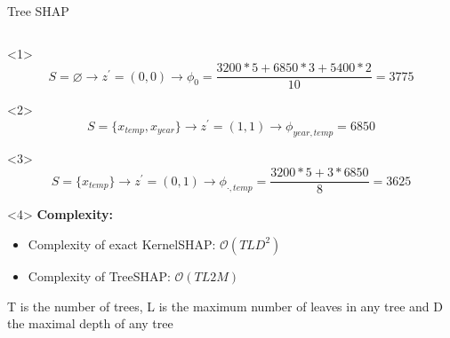 \documentclass[11pt,compress,t,notes=noshow, aspectratio=169, xcolor=table]{beamer}
\begin{document}
\begin{vbframe}{Tree SHAP}
\begin{onlyenv}
\begin{table}
\begin{columns}[T]
\begin{column}{0.7\textwidth}
\end{column}
\end{columns}
\end{table}

\begin{onlyenv}<1>
$$
S = \varnothing \rightarrow z^{\prime} = (0, 0) \rightarrow \phi_0 = \frac{3200*5 + 6850*3 +5400*2}{10}= 3775
$$
\end{onlyenv}

\begin{onlyenv}<2>
$$
S = \{x_{temp}, x_{year}\} \rightarrow z^{\prime} = (1, 1)  \rightarrow \phi_{year, temp} = 6850
$$
\end{onlyenv}

\begin{onlyenv}<3>
$$
S = \{x_{temp}\} \rightarrow z^{\prime} = (0, 1)  \rightarrow \phi_{\cdot, temp} = \frac{3200*5 + 3* 6850}{8} = 3625
$$
\end{onlyenv}
\end{onlyenv}

\begin{onlyenv}<4>
\vspace{1.5cm}
\textbf{Complexity:}
\begin{itemize}
    \item Complexity of exact KernelSHAP: $\mathcal{O}(TLD^2)$
    \item Complexity of TreeSHAP: $\mathcal{O}(TL2M)$
\end{itemize}

T is the number of trees, L is the maximum number of leaves in any tree and D the maximal depth of any tree
\end{onlyenv}


\end{vbframe}
\end{document}
